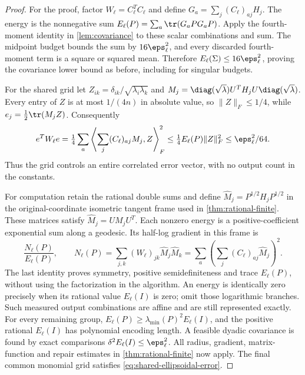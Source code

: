 \begin{proof}
For the proof, factor $W_\ell=C_\ell^TC_\ell$ and define
$G_a=\sum_j(C_\ell)_{aj}H_j$. The energy is the nonnegative sum
$E_\ell(P)=\sum_a\tr(G_aPG_aP)$. Apply the fourth-moment identity
in \cref{lem:covariance} to these scalar combinations and sum. The
midpoint budget bounds the sum by $16\eps_\ell^2$, and every discarded
fourth-moment term is a square or squared mean. Therefore
$E_\ell(\Sigma)\le16\eps_\ell^2$, proving the covariance lower bound
as before, including for singular budgets.

For the shared grid let
$Z_{ik}=\delta_{ik}/\sqrt{\lambda_i\lambda_k}$ and
$M_j=\diag(\sqrt\lambda)U^TH_jU\diag(\sqrt\lambda)$. Every entry of
$Z$ is at most $1/(4n)$ in absolute value, so $\|Z\|_F\le1/4$, while
$e_j=\frac12\tr(M_jZ)$. Consequently
\begin{equation}\label{eq:shared-ellipsoidal-error}
 e^TW_\ell e
 =\tfrac14\sum_a\left\langle\sum_j(C_\ell)_{aj}M_j,Z\right\rangle_F^2
 \le\tfrac14E_\ell(P)\|Z\|_F^2\le\eps_\ell^2/64.
\end{equation}
Thus the grid controls an entire correlated error vector, with no output
count in the constants.

For computation retain the rational double sums and define
$\widehat M_j=P^{1/2}H_jP^{1/2}$ in the original-coordinate isometric
tangent frame used in \cref{thm:rational-finite}. These matrices satisfy
$\widehat M_j=UM_jU^T$. Each nonzero energy is a positive-coefficient
exponential sum along a geodesic. Its half-log gradient in this frame is
\[
 \frac{N_\ell(P)}{E_\ell(P)},\qquad
 N_\ell(P)=\sum_{j,k}(W_\ell)_{jk}\widehat M_j\widehat M_k
       =\sum_a\left(\sum_j(C_\ell)_{aj}\widehat M_j\right)^2.
\]
The last identity proves symmetry, positive semidefiniteness and trace
$E_\ell(P)$, without using the factorization in the algorithm. An energy
is identically zero precisely when its rational value $E_\ell(I)$ is
zero; omit those logarithmic branches. Such measured output combinations
are affine and are still represented exactly. For every remaining group,
$E_\ell(P)\ge\lambda_{\min}(P)^2E_\ell(I)$, and the positive rational
$E_\ell(I)$ has polynomial encoding length. A feasible dyadic covariance
is found by exact comparisons $\delta^2E_\ell(I)\le\eps_\ell^2$.
All radius, gradient, matrix-function and repair estimates in
\cref{thm:rational-finite} now apply. The final common monomial grid
satisfies \eqref{eq:shared-ellipsoidal-error}.
\end{proof}

